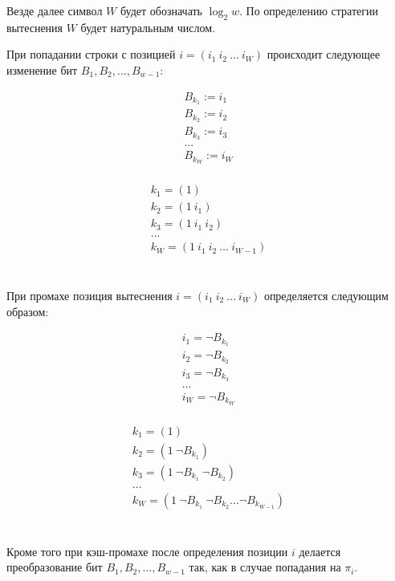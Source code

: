 Везде далее символ $W$ будет обозначать $\log_2 w$. По определению
стратегии вытеснения \PseudoLRU $W$ будет натуральным числом.

\begin{utv}\label{wMinus1PseudoLRU}При попадании строки с позицией
$i = (i_1~i_2~\dots~i_W)$ происходит следующее изменение бит $B_1,
B_2, ..., B_{w{-}1}$:

\parbox{0.3\textwidth}{
  $$ \begin{array}{l}
  B_{k_1} := i_1 \\
  B_{k_2} := i_2 \\
  B_{k_3} := i_3 \\
  ...\\
  B_{k_W} := i_W \\
  \end{array}$$
} \vline
\parbox{0.7\textwidth}{
  $$ \begin{array}{l}
  k_1 = (1) \\
  k_2 = (1~i_1) \\
  k_3 = (1~i_1~i_2) \\
  ...\\
  k_W = (1~i_1~i_2~\dots~i_{W{-}1}) \\
  \end{array} $$
}
\\[1cm]

При промахе позиция вытеснения $i = (i_1~i_2~\dots~i_W)$ определяется
следующим образом:

\parbox{0.3\textwidth}{
  $$ \begin{array}{l}
  i_1 = \neg B_{k_1} \\
  i_2 = \neg B_{k_2} \\
  i_3 = \neg B_{k_3} \\
  ...\\
  i_W = \neg B_{k_W} \\
  \end{array}$$
} \vline
\parbox{0.7\textwidth}{
  $$ \begin{array}{l}
  k_1 = (1) \\
  k_2 = (1~\neg B_{k_1}) \\
  k_3 = (1~\neg B_{k_1}~\neg B_{k_2}) \\
  ...\\
  k_W = (1~\neg B_{k_1}~\neg B_{k_2}\dots\neg B_{k_{W{-}1}}) \\
  \end{array} $$
}
\\[0.5cm]

Кроме того при кэш-промахе после определения позиции $i$ делается
преобразование бит $B_1, B_2, ..., B_{w{-}1}$ так, как в случае
попадания на $\pi_i$.
\end{utv}

